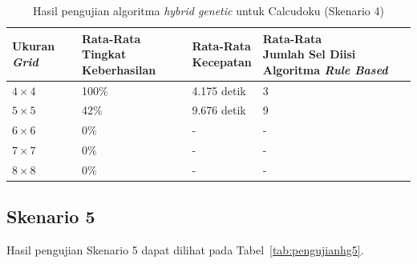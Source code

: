\begin{table}
\centering
\captionsetup{justification=centering}
\caption[Hasil pengujian algoritma \textit{hybrid genetic} untuk Calcudoku (Skenario 4)]{Hasil pengujian algoritma \textit{hybrid genetic} untuk Calcudoku (Skenario 4)}
\begin{tabular}{| l | l | l | l |}
\hline
Ukuran \textit{Grid} & \makecell[l]{Rata-Rata \\ Tingkat Keberhasilan} & \makecell[l]{Rata-Rata \\ Kecepatan} & \makecell[l]{Rata-Rata \\ Jumlah Sel Diisi Algoritma \textit{Rule Based}} \\
\hline \hline
\begin{math}4 \times 4\end{math} & 100\% & 4.175 detik & 3 \\
\hline
\begin{math}5 \times 5\end{math} & 42\% & 9.676 detik & 9 \\
\hline
\begin{math}6 \times 6\end{math} & 0\% & - & - \\
\hline
\begin{math}7 \times 7\end{math} & 0\% & - & - \\
\hline
\begin{math}8 \times 8\end{math} & 0\% & - & - \\
\hline
\end{tabular}
\label{tab:pengujianhg4}
\end{table}

\clearpage

\subsection{Skenario 5}
\label{sec:skenario5}

Hasil pengujian Skenario 5 dapat dilihat pada Tabel~\ref{tab:pengujianhg5}.

